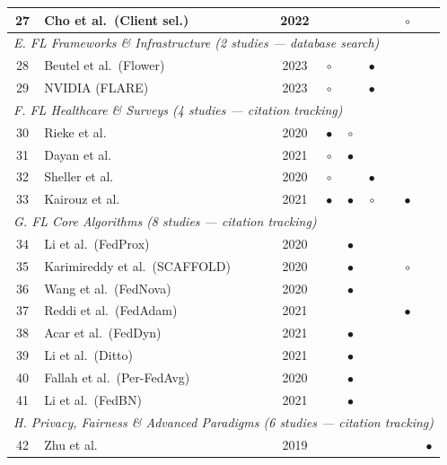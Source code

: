 \documentclass[conference]{IEEEtran}
\begin{document}
\begin{table}[htbp]
\begin{tabular}{clccccccc}
27 & Cho et al.\ (Client sel.)~\cite{cho2022towards} & 2022 & & & & & $\circ$ & \\
\midrule
\multicolumn{9}{l}{\textit{E. FL Frameworks \& Infrastructure (2 studies --- database search)}} \\
\midrule
28 & Beutel et al.\ (Flower)~\cite{beutel2023flower} & 2023 & $\circ$ & & $\bullet$ & & & \\
29 & NVIDIA (FLARE)~\cite{nvflare2023} & 2023 & $\circ$ & & $\bullet$ & & & \\
\midrule
\multicolumn{9}{l}{\textit{F. FL Healthcare \& Surveys (4 studies --- citation tracking)}} \\
\midrule
30 & Rieke et al.~\cite{rieke2020future} & 2020 & $\bullet$ & $\circ$ & & & & \\
31 & Dayan et al.~\cite{dayan2021federated} & 2021 & $\circ$ & $\bullet$ & & & & \\
32 & Sheller et al.~\cite{sheller2020federated} & 2020 & $\circ$ & & $\bullet$ & & & \\
33 & Kairouz et al.~\cite{kairouz2021advances} & 2021 & $\bullet$ & $\bullet$ & $\circ$ & & $\bullet$ & \\
\midrule
\multicolumn{9}{l}{\textit{G. FL Core Algorithms (8 studies --- citation tracking)}} \\
\midrule
34 & Li et al.\ (FedProx)~\cite{li2020federated} & 2020 & & $\bullet$ & & & & \\
35 & Karimireddy et al.\ (SCAFFOLD)~\cite{karimireddy2020scaffold} & 2020 & & $\bullet$ & & & $\circ$ & \\
36 & Wang et al.\ (FedNova)~\cite{wang2020tackling} & 2020 & & $\bullet$ & & & & \\
37 & Reddi et al.\ (FedAdam)~\cite{reddi2021adaptive} & 2021 & & & & & $\bullet$ & \\
38 & Acar et al.\ (FedDyn)~\cite{acar2021feddyn} & 2021 & & $\bullet$ & & & & \\
39 & Li et al.\ (Ditto)~\cite{li2021ditto} & 2021 & & $\bullet$ & & & & \\
40 & Fallah et al.\ (Per-FedAvg)~\cite{fallah2020personalized} & 2020 & & $\bullet$ & & & & \\
41 & Li et al.\ (FedBN)~\cite{li2021fedbn} & 2021 & & $\bullet$ & & & & \\
\midrule
\multicolumn{9}{l}{\textit{H. Privacy, Fairness \& Advanced Paradigms (6 studies --- citation tracking)}} \\
\midrule
42 & Zhu et al.~\cite{zhu2019deep} & 2019 & & & & & & $\bullet$ \\

\end{tabular}
\end{table}
\end{document}
